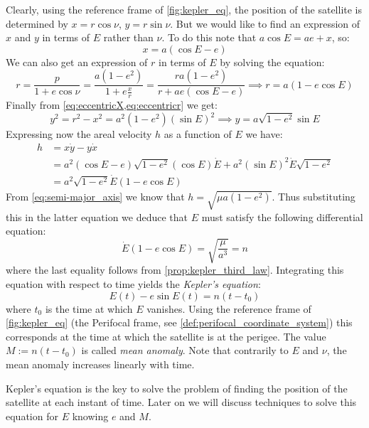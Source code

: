 \documentclass[../main.tex]{subfiles}
\begin{document}
Clearly, using the reference frame of \cref{fig:kepler_eq}, the position of the satellite is determined by $x=r\cos\nu$, $y=r\sin\nu$. But we would like to find an expression of $x$ and $y$ in terms of $E$ rather than $\nu$. To do this note that $a\cos E=ae+x$, so:
\begin{equation}\label{eq:eccentricX}
  x=a(\cos E-e)
\end{equation}
We can also get an expression of $r$ in terms of $E$ by solving the equation:
\begin{equation}\label{eq:eccentricr}
  r=\frac{p}{1+e\cos \nu}=\frac{a(1-e^2)}{1+e\frac{x}{r}}=\frac{ra(1-e^2)}{r+ae(\cos E-e)}\implies r= a(1-e\cos E)
\end{equation}
Finally from \cref{eq:eccentricX,eq:eccentricr} we get:
\begin{equation}
  y^2=r^2-x^2=a^2(1-e^2){(\sin E)}^2\implies y=a\sqrt{1-e^2}\sin E
\end{equation}
Expressing now the areal velocity $h$ as a function of $E$ we have:
\begin{align}
  h & =x\dot{y}-y\dot{x}                                                           \\
    & =a^2(\cos E-e)\sqrt{1-e^2}(\cos E)\dot{E}+a^2{(\sin E)}^2\dot{E}\sqrt{1-e^2} \\
    & =a^2\sqrt{1-e^2}\dot{E}(1-e\cos E)
\end{align}
From \cref{eq:semi-major_axis} we know that $h=\sqrt{\mu a(1-e^2)}$. Thus substituting this in the latter equation we deduce that $E$ must satisfy the following differential equation:
\begin{equation}\label{eq:kepler_equation_differential}
  \dot{E}(1-e\cos E)=\sqrt{\frac{\mu}{a^3}}=n
\end{equation}
where the last equality follows from \cref{prop:kepler_third_law}. Integrating this equation with respect to time yields the \emph{Kepler's equation}:
\begin{equation}\label{eq:kepler_equation}
  E(t)-e\sin E(t)=n(t-t_0)
\end{equation}
where $t_0$ is the time at which $E$ vanishes. Using the reference frame of \cref{fig:kepler_eq} (the Perifocal frame, see \cref{def:perifocal_coordinate_system}) this corresponds at the time at which the satellite is at the perigee. The value $M:=n(t-t_0)$ is called \emph{mean anomaly}. Note that contrarily to $E$ and $\nu$, the mean anomaly increases linearly with time.

Kepler's equation is the key to solve the problem of finding the position of the satellite at each instant of time. Later on we will discuss techniques to solve this equation for $E$ knowing $e$ and $M$.
\end{document}
